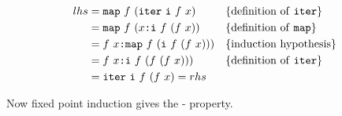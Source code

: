 \begin{align*}
lhs & = \texttt{map} \,\, f \,\, (\texttt{iter} \,\, \texttt{i} \,\, f \,\, x)          && \{\textrm{definition of \texttt{iter}}\} \\
    & = \texttt{map} \,\, f \,\, (x \texttt{:} \texttt{i} \,\, f \,\, (f \,\, x))       && \{\textrm{definition of \texttt{map}} \} \\
    & = f \,\, x \texttt{:} \texttt{map} \,\, f \,\, (\texttt{i} \,\, f \,\, (f \,\, x))) && \{\textrm{induction hypothesis} \} \\
    & = f \,\, x \texttt{:} \texttt{i} \,\, f \,\, (f \,\, (f \,\, x)))             && \{\textrm{definition of \texttt{iter}} \} \\
    & = \texttt{iter} \,\, \texttt{i} \,\, f \,\, (f \,\, x) = rhs
\end{align*}

Now fixed point induction gives the - property.



